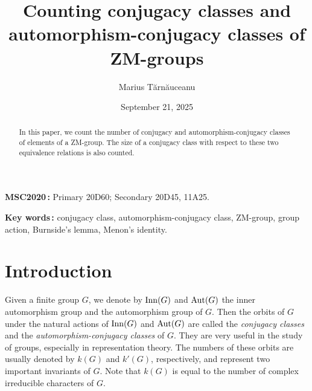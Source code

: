 \documentclass[12pt]{article}
\title{Counting conjugacy classes and automorphism-conjugacy classes of ZM-groups}
\author{Marius T\u arn\u auceanu}
\date{September 21, 2025}
\newcommand{\0}{{\leqno}}
\begin{document}
\maketitle

\begin{abstract}
In this paper, we count the number of conjugacy and automorphism-conjugacy classes of elements of a ZM-group. The size of a conjugacy class with respect to these two equivalence relations is also counted.
\end{abstract}

{\small
\noindent
{\bf MSC2020\,:} Primary 20D60; Secondary 20D45, 11A25.

\noindent
{\bf Key words\,:} conjugacy class, automorphism-conjugacy class, ZM-group, group action, Burnside's lemma, Menon's identity.}

\section{Introduction}

Given a finite group $G$, we denote by ${\rm Inn}(G)$ and ${\rm Aut}(G)$ the inner automorphism group and the automorphism group of $G$. Then the orbits of $G$ under the natural actions of ${\rm Inn}(G)$ and ${\rm Aut}(G)$ are called the \textit{conjugacy classes} and the \textit{automorphism-conjugacy classes} of $G$. They are very useful in the study of groups, especially in representation theory. The numbers of these orbits are usually denoted by $k(G)$ and $k'(G)$, respectively, and represent two important invariants of $G$. Note that $k(G)$ is equal to the number of complex irreducible characters of $G$.
\end{document}
